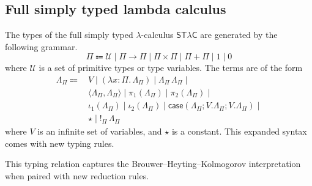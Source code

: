 \subsection{Full simply typed lambda calculus}
The types of the full simply typed \( \lambda \)-calculus \( \mathsf{ST}\lambda\mathsf{C} \) are generated by the following grammar.
\[ \Pi \Coloneq \mathcal U \mid \Pi \to \Pi \mid \Pi \times \Pi \mid \Pi + \Pi \mid 1 \mid 0 \]
where \( \mathcal U \) is a set of primitive types or type variables.
The terms are of the form
\begin{align*}
    \Lambda_\Pi \Coloneq\, & V \mid (\lambda x : \Pi.\, \Lambda_\Pi) \mid \Lambda_\Pi \, \Lambda_\Pi \mid \\
    &\langle \Lambda_\Pi, \Lambda_\Pi \rangle \mid \pi_1(\Lambda_\Pi) \mid \pi_2(\Lambda_\Pi) \mid \\
    &\iota_1(\Lambda_\Pi) \mid \iota_2(\Lambda_\Pi) \mid \mathsf{case}(\Lambda_\Pi;V.\Lambda_\Pi;V.\Lambda_\Pi) \mid \\
    &\star \mid {!_\Pi\, \Lambda_\Pi}
\end{align*}
where \( V \) is an infinite set of variables, and \( \star \) is a constant.
This expanded syntax comes with new typing rules.
This typing relation captures the Brouwer--Heyting--Kolmogorov interpretation when paired with new reduction rules.
